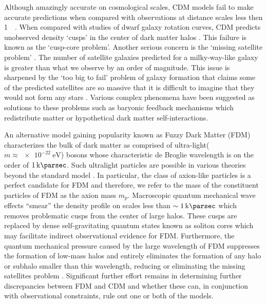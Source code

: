 \documentclass[usenatbib]{mnras}
\newcommand{\squote}[1]{\lq #1\rq}
\newcommand{\poweV}[1]{\SI{e#1}{\electronvolt}}
\begin{document}
\par
	Although amazingly accurate on cosmological scales, CDM models fail to make accurate predictions when compared with observations at distance scales less then \SI{1}{\kilo\parsec}. When compared with studies of dwarf galaxy rotation curves, CDM predicts unobserved density \squote{cusps} in the center of dark matter halos \citep{ultralight}. This failure is known as the \squote{cusp-core problem}. Another serious concern is the \squote{missing satellite problem}  \citep{missing_satellites}. The number of satellite galaxies predicted for a milky-way-like galaxy is greater than what we observe by an order of magnitude. This issue is sharpened by the \squote{too big to fail} problem of galaxy formation that claims some of the predicted satellites are so massive that it is difficult to imagine that they would not form any stars \citep{too_big_to_fail}. Various complex phenomena have been suggested as solutions to these problems such as baryonic feedback mechanisms which redistribute matter or  hypothetical dark matter self-interactions.

\par
	An alternative model gaining popularity known as Fuzzy Dark Matter (FDM) characterizes the bulk of dark matter as comprised of ultra-light($m \approx \poweV{-22}$) bosons whose characteristic de Broglie wavelength is on the order of $\SI{1}{\kilo\parsec}$. Such ultralight particles are possible in various theories beyond the standard model \citep{axion_cosmology}. In particular, the class of axion-like particles is a perfect candidate for FDM and therefore, we refer to the mass of the constituent particles of FDM as the axion mass $m_p$. Macroscopic quantum mechanical wave effects “smear” the density profile on scales less than $\sim \SI{1}{\kilo\parsec}$ which removes problematic cusps from the center of large halos. These cusps are replaced by dense self-gravitating quantum states known as soliton cores which may facilitate indirect observational evidence for FDM. Furthermore, the quantum mechanical pressure caused by the large wavelength of FDM suppresses the formation of low-mass halos and entirely eliminates the formation of any halo or subhalo smaller than this wavelength, reducing or eliminating the missing satellites problem \citep{numerical-Schrodinger}. Significant further effort remains in determining further discrepancies between FDM and CDM and whether these can, in conjunction with observational constraints, rule out one or both of the models.
 
\end{document}
